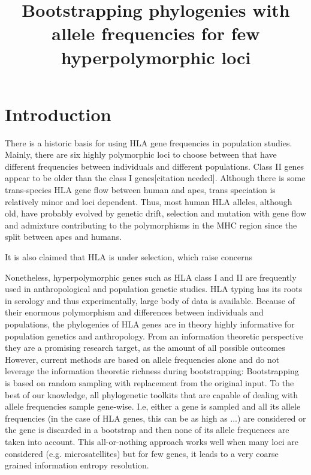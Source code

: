 \documentclass{article}
\title{Bootstrapping phylogenies with allele frequencies for few hyperpolymorphic loci}
\begin{document}
\section{Introduction}
There is a historic basis for using HLA gene frequencies in population studies. Mainly, there are six highly polymorphic
loci to choose between that have different frequencies between individuals and different populations. Class II genes
appear to be older than the class I genes[citation needed]. Although there is some trans-species HLA gene flow between human and apes,
trans speciation is relatively minor and loci dependent. Thus, most human HLA alleles, although old, have probably
evolved by genetic drift, selection and mutation with gene flow and admixture contributing to the polymorphisms in the
MHC region since the split between apes and humans.


It is also claimed that HLA is under selection, which raise concerns %


Nonetheless, hyperpolymorphic genes such as HLA class I and II are frequently used in anthropological and population genetic studies.
HLA typing has its roots in serology and thus experimentally, large body of data is available.
Because of their enormous polymorphism and differences between individuals and populations, the phylogenies of HLA genes
are in theory highly informative for population genetics and anthropology. From an information theoretic perspective
they are a promising research target, as the amount of all possible outcomes
However, current methods are based on allele frequencies alone and do not leverage the information theoretic richness during bootstrapping:
Bootstrapping is based on random sampling with replacement from the original input. To the best of our knowledge,
all phylogenetic toolkits that are capable of dealing with allele frequencies sample gene-wise.
I.e, either a gene is sampled and all its allele frequencies (in the case of HLA genes, this can be as high as ...)
are considered or the gene is discarded in a bootstrap and then none of its allele frequences are taken into
account. This all-or-nothing approach works well when many loci are considered (e.g. microsatellites)
but for few genes, it leads to a very coarse grained information entropy resolution.
\end{document}
